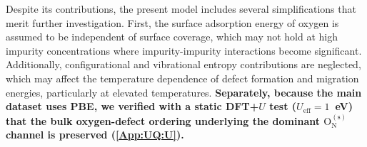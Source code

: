 \documentclass[preprint,12pt,sort&compress]{elsarticle}
\newcommand{\?}{\stackrel{?}{=}}
\providecommand{\DIFaddtex}[1]{{\bf #1}} %
\providecommand{\DIFaddbegin}{\protect\color{blue}} %
\providecommand{\DIFaddend}{\protect\color{black}} %
\providecommand{\DIFadd}[1]{\texorpdfstring{\DIFaddtex{#1}}{#1}} %
\begin{document}

Despite its contributions, the present model includes several simplifications that merit further investigation. First, the surface adsorption energy of oxygen is assumed to be independent of surface coverage, which may not hold at high impurity concentrations where impurity-impurity interactions become significant. Additionally, configurational and vibrational entropy contributions are neglected, which may affect the temperature dependence of defect formation and migration energies, particularly at elevated temperatures. \DIFaddbegin \DIFadd{Separately, because the main dataset uses PBE, we verified with a static DFT+$U$ test ($U_\text{eff}=1$~eV) that the bulk oxygen-defect ordering underlying the dominant $\text{O}_\text{N}^{(\text{s})}$ channel is preserved (\ref{App:UQ:U}).
}\DIFaddend 
\end{document}
